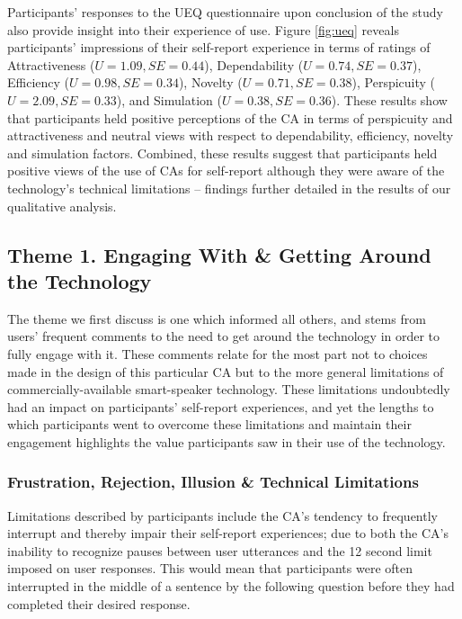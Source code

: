             Participants' responses to the \ac{UEQ} questionnaire upon conclusion of the study also provide insight into their experience of use. Figure \ref{fig:ueq} reveals participants' impressions of their self-report experience in terms of ratings of Attractiveness ($U = 1.09, SE = 0.44 $), Dependability ($U = 0.74, SE = 0.37 $), Efficiency ($U = 0.98, SE = 0.34 $), Novelty ($U = 0.71, SE = 0.38 $), Perspicuity ($U = 2.09, SE = 0.33 $), and Simulation ($U = 0.38, SE = 0.36 $). These results show that participants held positive perceptions of the \ac{CA} in terms of perspicuity and attractiveness and neutral views with respect to dependability, efficiency, novelty and simulation factors. Combined, these results suggest that participants held positive views of the use of \acp{CA} for self-report although they were aware of the technology's technical limitations -- findings further detailed in the results of our qualitative analysis.

    \subsection{Theme 1. Engaging With \& Getting Around the Technology} %

        The theme we first discuss is one which informed all others, and stems from users' frequent comments to the need to get around the technology in order to fully engage with it. These comments relate for the most part not to choices made in the design of this particular \ac{CA} but to the more general limitations of commercially-available smart-speaker technology. These limitations undoubtedly had an impact on participants' self-report experiences, and yet the lengths to which participants went to overcome these limitations and maintain their engagement highlights the value participants saw in their use of the technology.
        
        \subsubsection{Frustration, Rejection, Illusion \& Technical Limitations}
        
            Limitations described by participants include the \ac{CA}'s tendency to frequently interrupt and thereby impair their self-report experiences; due to both the \ac{CA}'s inability to recognize pauses between user utterances and the 12 second limit imposed on user responses. This would mean that participants were often interrupted in the middle of a sentence by the following question before they had completed their desired response. 
            
